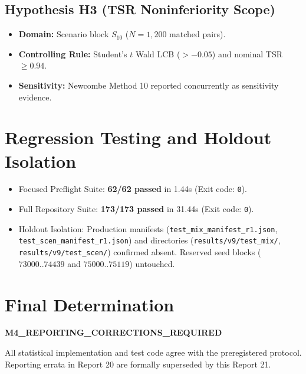 \documentclass[10pt,a4paper]{article}
\begin{document}
\subsection{Hypothesis H3 (TSR Noninferiority Scope)}
\begin{itemize}
    \item \textbf{Domain:} Scenario block $S_{10}$ ($N = 1,200$ matched pairs).
    \item \textbf{Controlling Rule:} Student's $t$ Wald LCB ($> -0.05$) and nominal TSR $\ge 0.94$.
    \item \textbf{Sensitivity:} Newcombe Method 10 reported concurrently as sensitivity evidence.
\end{itemize}

\section{Regression Testing and Holdout Isolation}
\begin{itemize}
    \item Focused Preflight Suite: \textbf{62/62 passed} in 1.44s (Exit code: \texttt{0}).
    \item Full Repository Suite: \textbf{173/173 passed} in 31.44s (Exit code: \texttt{0}).
    \item Holdout Isolation: Production manifests (\texttt{test\_mix\_manifest\_r1.json}, \texttt{test\_scen\_manifest\_r1.json}) and directories (\texttt{results/v9/test\_mix/}, \texttt{results/v9/test\_scen/}) confirmed absent. Reserved seed blocks ($73000..74439$ and $75000..75119$) untouched.
\end{itemize}

\section{Final Determination}

\begin{center}
{\Large \textbf{M4\_REPORTING\_CORRECTIONS\_REQUIRED}}
\end{center}

\noindent All statistical implementation and test code agree with the preregistered protocol. Reporting errata in Report 20 are formally superseded by this Report 21.

\vspace{10pt}
\noindent{}
\end{document}
